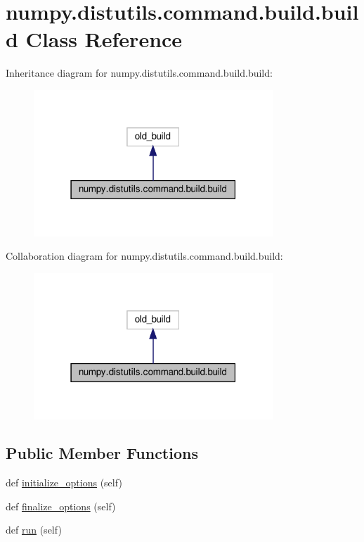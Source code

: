 \hypertarget{classnumpy_1_1distutils_1_1command_1_1build_1_1build}{}\section{numpy.\+distutils.\+command.\+build.\+build Class Reference}
\label{classnumpy_1_1distutils_1_1command_1_1build_1_1build}


Inheritance diagram for numpy.\+distutils.\+command.\+build.\+build\+:
\nopagebreak
\begin{figure}[H]
\begin{center}
\leavevmode
\includegraphics[width=255pt]{classnumpy_1_1distutils_1_1command_1_1build_1_1build__inherit__graph}
\end{center}
\end{figure}


Collaboration diagram for numpy.\+distutils.\+command.\+build.\+build\+:
\nopagebreak
\begin{figure}[H]
\begin{center}
\leavevmode
\includegraphics[width=255pt]{classnumpy_1_1distutils_1_1command_1_1build_1_1build__coll__graph}
\end{center}
\end{figure}
\subsection*{Public Member Functions}
\begin{DoxyCompactItemize}
\item 
def \hyperlink{classnumpy_1_1distutils_1_1command_1_1build_1_1build_ab3542893505167cd6c5275a9da1443a6}{initialize\+\_\+options} (self)
\item 
def \hyperlink{classnumpy_1_1distutils_1_1command_1_1build_1_1build_a774225191d2038d9c06161f684f0a881}{finalize\+\_\+options} (self)
\item 
def \hyperlink{classnumpy_1_1distutils_1_1command_1_1build_1_1build_a596e6816cded3bb4f37ab8952bbb2bb7}{run} (self)
\end{DoxyCompactItemize}
